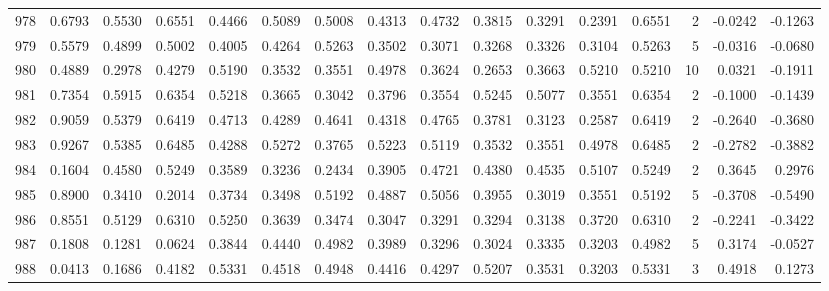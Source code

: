 \begin{tabular}{lrrrrrrrrrrrrrrr}
978 &      0.6793 &  0.5530 &  0.6551 &  0.4466 &  0.5089 &  0.5008 &  0.4313 &  0.4732 &  0.3815 &  0.3291 &   0.2391 &     0.6551 &      2 &                   -0.0242 &                    -0.1263 \\
979 &      0.5579 &  0.4899 &  0.5002 &  0.4005 &  0.4264 &  0.5263 &  0.3502 &  0.3071 &  0.3268 &  0.3326 &   0.3104 &     0.5263 &      5 &                   -0.0316 &                    -0.0680 \\
980 &      0.4889 &  0.2978 &  0.4279 &  0.5190 &  0.3532 &  0.3551 &  0.4978 &  0.3624 &  0.2653 &  0.3663 &   0.5210 &     0.5210 &     10 &                    0.0321 &                    -0.1911 \\
981 &      0.7354 &  0.5915 &  0.6354 &  0.5218 &  0.3665 &  0.3042 &  0.3796 &  0.3554 &  0.5245 &  0.5077 &   0.3551 &     0.6354 &      2 &                   -0.1000 &                    -0.1439 \\
982 &      0.9059 &  0.5379 &  0.6419 &  0.4713 &  0.4289 &  0.4641 &  0.4318 &  0.4765 &  0.3781 &  0.3123 &   0.2587 &     0.6419 &      2 &                   -0.2640 &                    -0.3680 \\
983 &      0.9267 &  0.5385 &  0.6485 &  0.4288 &  0.5272 &  0.3765 &  0.5223 &  0.5119 &  0.3532 &  0.3551 &   0.4978 &     0.6485 &      2 &                   -0.2782 &                    -0.3882 \\
984 &      0.1604 &  0.4580 &  0.5249 &  0.3589 &  0.3236 &  0.2434 &  0.3905 &  0.4721 &  0.4380 &  0.4535 &   0.5107 &     0.5249 &      2 &                    0.3645 &                     0.2976 \\
985 &      0.8900 &  0.3410 &  0.2014 &  0.3734 &  0.3498 &  0.5192 &  0.4887 &  0.5056 &  0.3955 &  0.3019 &   0.3551 &     0.5192 &      5 &                   -0.3708 &                    -0.5490 \\
986 &      0.8551 &  0.5129 &  0.6310 &  0.5250 &  0.3639 &  0.3474 &  0.3047 &  0.3291 &  0.3294 &  0.3138 &   0.3720 &     0.6310 &      2 &                   -0.2241 &                    -0.3422 \\
987 &      0.1808 &  0.1281 &  0.0624 &  0.3844 &  0.4440 &  0.4982 &  0.3989 &  0.3296 &  0.3024 &  0.3335 &   0.3203 &     0.4982 &      5 &                    0.3174 &                    -0.0527 \\
988 &      0.0413 &  0.1686 &  0.4182 &  0.5331 &  0.4518 &  0.4948 &  0.4416 &  0.4297 &  0.5207 &  0.3531 &   0.3203 &     0.5331 &      3 &                    0.4918 &                     0.1273 \\

\end{tabular}
